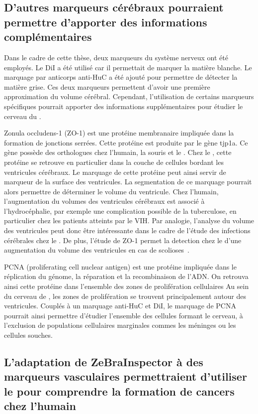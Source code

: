 \documentclass[\main/main.tex]{subfiles}
\begin{document}
    \subsection{D'autres marqueurs cérébraux pourraient permettre d'apporter des informations complémentaires}
   
%
Dans le cadre de cette thèse, deux marqueurs du système nerveux ont été employés.
%
Le DiI a été utilisé car il permettait de marquer la matière blanche.
%
Le marquage par anticorps anti-HuC a été ajouté pour permettre de détecter la matière grise.
%
Ces deux marqueurs permettent d'avoir une première approximation du volume cérébral.
%
Cependant, l'utilisation de certains marqueurs spécifiques pourrait apporter des informations supplémentaires pour étudier le cerveau du \pz{}.

%
Zonula occludens-1 (ZO-1) est une protéine membranaire impliquée dans la formation de jonctions serrées.
%
Cette protéine est produite par le gène tjp1a.
%
Ce gène possède des orthologues chez l'humain, la souris et le \pz{}.
%
Chez le \pz{}, cette protéine se retrouve en particulier dans la couche de cellules bordant les ventricules cérébraux.
%
Le marquage de cette protéine peut ainsi servir de marqueur de la surface des ventricules.
%
La segmentation de ce marquage pourrait alors permettre de déterminer le volume du ventricule.
%
Chez l'humain, l'augmentation du volumes des ventricules cérébraux est associé à l'hydrocéphalie, par exemple une complication possible de la tuberculose, en particulier chez les patients atteints par le VIH.
%
Par analogie, l'analyse du volume des ventricules peut donc être intéressante dans le cadre de l'étude des infections cérébrales chez le \pz{}.
%
De plus, l'étude de ZO-1 permet la detection chez le \pz{} d'une augmentation du volume des ventricules en cas de scolioses~\cite{vesque_2019}.

PCNA (proliferating cell nuclear antigen) est une protéine impliquée dans le réplication du génome, la réparation et la recombinaison de l'ADN.
%
On retrouva ainsi cette protéine dans l'ensemble des zones de prolifération cellulaires
%
Au sein du cerveau de \pz{}, les zones de prolifération se trouvent principalement autour des ventricules.
%
Couplés à un marquage anti-HuC et DiI, le marquage de PCNA pourrait ainsi permettre d'étudier l'ensemble des cellules formant le cerveau, à l'exclusion de populations cellulaires marginales commes les méninges ou les cellules souches.

    \subsection{\label{chap:bio:marqueurs:vasc}
    L'adaptation de ZeBraInspector à des marqueurs vasculaires permettraient d'utiliser le \pz{} pour comprendre la formation de cancers chez l'humain
    }
\end{document}
